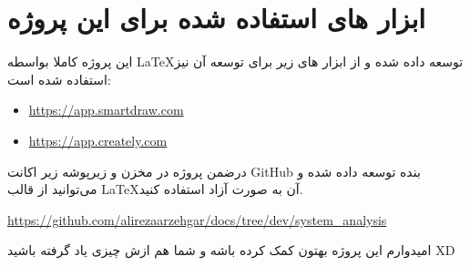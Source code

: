 \newpage

\section{ابزار های استفاده شده برای این پروژه}

این پروژه کاملا بواسطه \LaTeX توسعه داده شده و از ابزار های زیر برای توسعه آن نیز استفاده شده است:

\begin{itemize}
	\item \hyperlink{https://app.smartdraw.com}{https://app.smartdraw.com}
	\item \hyperlink{https://app.creately.com}{https://app.creately.com}
\end{itemize}

درضمن پروژه در مخزن و زیرپوشه زیر اکانت GitHub بنده توسعه داده شده و می‌توانید از قالب \LaTeX آن به صورت آزاد استفاده کنید.

\hyperlink{https://github.com/alirezaarzehgar/docs/tree/dev/system_analysis}{https://github.com/alirezaarzehgar/docs/tree/dev/system_analysis}

امیدوارم این پروژه بهتون کمک کرده باشه و شما هم ازش چیزی یاد گرفته باشید XD
